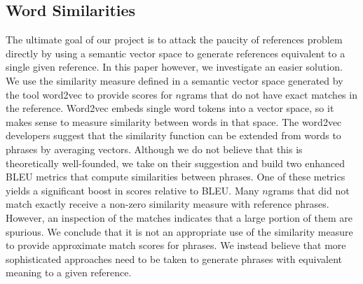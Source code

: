 
\subsection{Word Similarities}
\label{sec:wordsims}

The ultimate goal of our project is to attack the paucity of references problem directly by using a semantic vector space to generate references equivalent to a single given reference. 
In this paper however, we investigate an easier solution. 
We use the similarity measure defined in a semantic vector space generated by the tool word2vec to provide scores for $n$grams that do not have exact matches in the reference. 
Word2vec embeds single word tokens into a vector space, so it makes sense to measure similarity between words in that space. 
The word2vec developers suggest that the similarity function can be extended from words to phrases by averaging vectors. 
Although we do not believe that this is theoretically  well-founded, we take on their suggestion and build two enhanced BLEU metrics that compute similarities between phrases. 
One of these metrics yields a significant boost in scores relative to BLEU. 
Many $n$grams that did not match exactly receive a non-zero similarity measure with reference phrases. 
However, an inspection of the matches indicates that a large portion of them are spurious. 
We conclude that it is not an appropriate use of the similarity measure to provide approximate match scores for phrases. 
We instead believe that more sophisticated approaches need to be taken to generate phrases with equivalent meaning to a given reference. 



